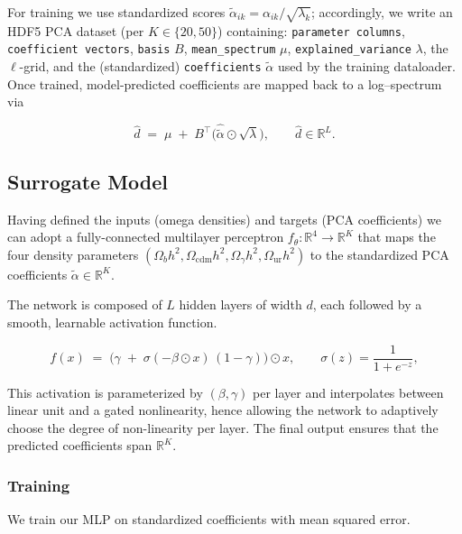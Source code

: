 \documentclass[11pt,a4paper]{article}
\numberwithin{equation}{section}
\begin{document}
For training we use standardized scores \(\tilde\alpha_{ik}=\alpha_{ik}/\sqrt{\lambda_k}\); accordingly, 
we write an HDF5 PCA dataset (per \(K\in\{20,50\}\)) containing: \texttt{parameter columns}, \texttt{coefficient vectors},  \texttt{basis} \(B\), \texttt{mean\_spectrum} \(\mu\), \texttt{explained\_variance} \(\lambda\), the \(\ell\)-grid, and the (standardized) \texttt{coefficients} \(\tilde\alpha\) used by the training dataloader. 
Once trained, model-predicted coefficients are mapped back to a log–spectrum via 

\begin{equation}
  \widehat{d} \;=\; \mu \;+\; B^\top
  \big(\widehat{\tilde{\alpha}}\odot\sqrt{\lambda}\big),
  \qquad \widehat{d}\in\mathbb{R}^{L}.
\end{equation}

\subsection{Surrogate Model}
\label{sec:surrogate}

Having defined the inputs (omega densities) and targets (PCA coefficients) we can adopt a fully-connected multilayer perceptron 
$f_\theta:\mathbb{R}^4\to\mathbb{R}^K$ that maps the four density parameters $(\Omega_b h^2, \Omega_{\mathrm{cdm}} h^2, \Omega_\gamma h^2, \Omega_{\mathrm{ur}} h^2)$ 
to the standardized PCA coefficients $\tilde\alpha\in\mathbb{R}^K$. 

The network is composed of $L$ hidden layers of width $d$, each followed by a smooth, learnable activation function.

\begin{equation}
  f(x) \;=\; 
  \Big( \gamma \;+\; \sigma(-\beta \odot x)\,(1-\gamma) \Big) \odot x,
  \qquad 
  \sigma(z) = \frac{1}{1+e^{-z}} ,
\end{equation}


This activation is parameterized by $(\beta, \gamma)$ per layer and interpolates between linear unit and a gated nonlinearity, 
hence allowing the network to adaptively choose the degree of non-linearity per layer.  
The final output ensures that the predicted coefficients span  $\mathbb{R}^K$. 


\subsubsection{Training}

We train our MLP on standardized coefficients with mean squared error.
\end{document}
